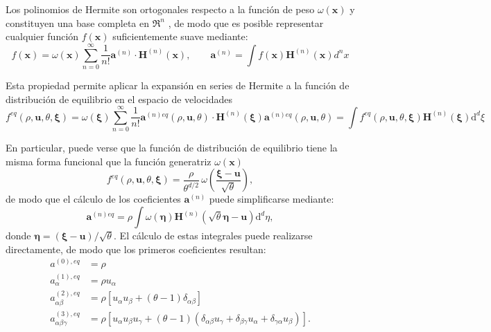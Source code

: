 Los polinomios de Hermite son ortogonales respecto a la funci\'on de peso $\omega(\bm{x})$ y constituyen una base completa en $\Re^n$ \cite{wiener_fourier_1989}, de modo que es posible representar cualquier funci\'on $f(\bm{x})$ suficientemente suave mediante:
\begin{equation}
	f(\bm{x}) = \omega(\bm{x}) \sum_{n=0}^{\infty}\dfrac{1}{n!}\bm{a}^{(n)} \cdot \bm{H}^{(n)}(\bm{x}), \qquad 
	\bm{a}^{(n)} = \int f(\bm{x})\bm{H}^{(n)}(\bm{x}) d^nx
\end{equation}

Esta propiedad permite aplicar la expansi\'on en series de Hermite a la funci\'on de distribuci\'on de equilibrio en el espacio de velocidades
\begin{subequations}
	\begin{equation}
		f^{eq}(\rho, \bm{u}, \theta, \bm{\xi}) = \omega(\bm{\xi}) \sum_{n=0}^{\infty}\dfrac{1}{n!}\bm{a}^{(n)eq}(\rho, \bm{u}, \theta) \cdot \bm{H}^{(n)}(\bm{\xi})
	\end{equation}
	\begin{equation}
		\bm{a}^{(n)eq}(\rho, \bm{u}, \theta) = \int f^{eq}(\rho, \bm{u}, \theta, \bm{\xi})\bm{H}^{(n)}(\bm{\xi}) \mbox{d}^d \xi
	\end{equation}
	\label{eq:feq_hermite}
\end{subequations}

En particular, puede verse que la funci\'on de distribuci\'on de equilibrio tiene la misma forma funcional que la funci\'on generatriz $\omega(\bm{x})$
\begin{equation}
	f^{eq}(\rho, \bm{u}, \theta, \bm{\xi}) = \dfrac{\rho}{\theta^{d/2}} \, \omega \left( \dfrac{\bm{\xi} - \bm{u}}{\sqrt{\theta}} \right),
\end{equation}
de modo que el c\'alculo de los coeficientes $\bm{a}^{(n)}$ puede simplificarse mediante:
\begin{equation}
	\bm{a}^{(n)eq} = \rho \int \omega(\bm{\eta})\bm{H}^{(n)}(\sqrt{\theta}\bm{\eta} - \bm{u}) \mbox{d}^d \eta,
\end{equation}
donde $\bm{\eta} = (\bm{\xi} - \bm{u})/\sqrt{\theta}$. El c\'alculo de estas integrales puede realizarse directamente, de modo que los primeros coeficientes resultan:
\begin{subequations}
	\begin{align}
		a^{(0),eq}          &= \rho              \\ 
		a^{(1),eq}_{\alpha} &= \rho u_{\alpha}   \\
		a^{(2),eq}_{\alpha\beta} &= \rho \left[ u_{\alpha} u_{\beta} + (\theta-1)\delta_{\alpha\beta} \right]   \\
		a^{(3),eq}_{\alpha\beta\gamma} &= \rho \left[ u_{\alpha} u_{\beta} u_{\gamma} + (\theta-1)(\delta_{\alpha\beta}u_{\gamma} + \delta_{\beta\gamma}u_{\alpha} + \delta_{\gamma\alpha}u_{\beta}) \right].
	\end{align}
	\label{eq:eq_coeffs}
\end{subequations}

